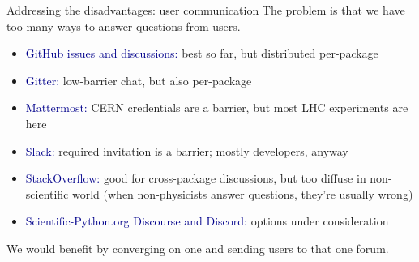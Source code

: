 \documentclass[aspectratio=169]{beamer}
\begin{document}
\begin{frame}{Addressing the disadvantages: user communication}
\vspace{0.25 cm}
The problem is that we have too many ways to answer questions from users.

\vspace{0.25 cm}
\begin{itemize}
\item \textcolor{darkblue}{GitHub issues and discussions:} best so far, but distributed per-package
\item \textcolor{darkblue}{Gitter:} low-barrier chat, but also per-package
\item \textcolor{darkblue}{Mattermost:} CERN credentials are a barrier, but most LHC experiments are here
\item \textcolor{darkblue}{Slack:} required invitation is a barrier; mostly developers, anyway
\item \textcolor{darkblue}{StackOverflow:} good for cross-package discussions, but too diffuse in non-scientific world (when non-physicists answer questions, they're usually wrong)
\item \textcolor{darkblue}{Scientific-Python.org Discourse and Discord:} options under consideration
\end{itemize}

\vspace{0.5 cm}
We would benefit by converging on one and sending users to that one forum.
\end{frame}
\end{document}
